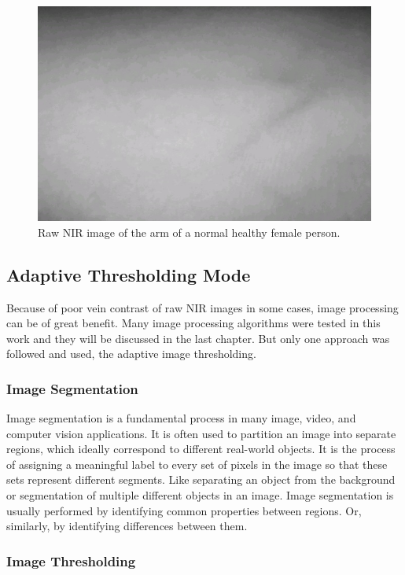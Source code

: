 \begin{figure}[H]
\centering
\includegraphics{figures/nirZein.JPG}
\caption[Raw NIR Image of an Arm with Poor Vein Contrast]{Raw NIR image of the arm of a normal healthy female person.}\label{fig:RawNirImage1}
\end{figure}

\subsection{Adaptive Thresholding Mode}
Because of poor vein contrast of raw NIR images in some cases, image processing can be of great benefit. Many image processing algorithms were tested in this work and they will be discussed in the last chapter. But only one approach was followed and used, the adaptive image thresholding.
\subsubsection{Image Segmentation}
Image segmentation is a fundamental process in many image, video, and computer vision applications. It is often used to partition an image into separate regions, which ideally correspond to different real-world objects\parencite{imageSeg}. It is the process of assigning a meaningful label to every set of pixels in the image so that these sets represent different segments. Like separating an object from the background or segmentation of multiple different objects in an image. Image segmentation is usually performed by identifying common properties between regions. Or, similarly, by identifying differences between them.

\subsubsection{Image Thresholding}

